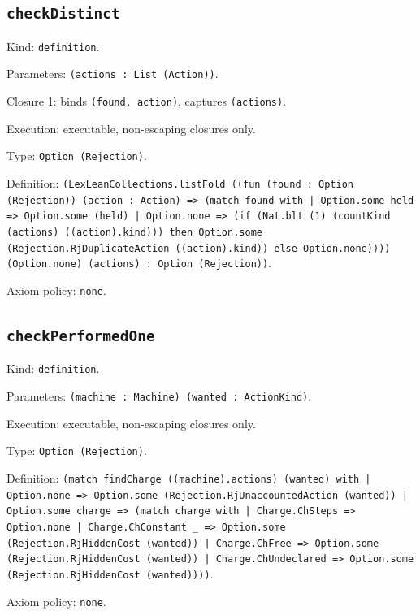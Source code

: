 \documentclass[11pt]{article}
\begin{document}
\subsection*{\texttt{checkDistinct}}
\noindent Kind: \texttt{definition}.\par
\noindent Parameters: \texttt{(actions : List (Action))}.\par
\noindent Closure 1: binds \texttt{(found, action)}, captures \texttt{(actions)}.\par
\noindent Execution: executable, non-escaping closures only.\par
\noindent Type: \texttt{Option (Rejection)}.\par
\noindent Definition: \texttt{(LexLeanCollections.listFold ((fun (found : Option (Rejection)) (action : Action) => (match found with | Option.some held => Option.some (held) | Option.none => (if (Nat.blt (1) (countKind (actions) ((action).kind))) then Option.some (Rejection.RjDuplicateAction ((action).kind)) else Option.none)))) (Option.none) (actions) : Option (Rejection))}.\par
\noindent Axiom policy: \texttt{none}.\par
\subsection*{\texttt{checkPerformedOne}}
\noindent Kind: \texttt{definition}.\par
\noindent Parameters: \texttt{(machine : Machine) (wanted : ActionKind)}.\par
\noindent Execution: executable, non-escaping closures only.\par
\noindent Type: \texttt{Option (Rejection)}.\par
\noindent Definition: \texttt{(match findCharge ((machine).actions) (wanted) with | Option.none => Option.some (Rejection.RjUnaccountedAction (wanted)) | Option.some charge => (match charge with | Charge.ChSteps => Option.none | Charge.ChConstant \_ => Option.some (Rejection.RjHiddenCost (wanted)) | Charge.ChFree => Option.some (Rejection.RjHiddenCost (wanted)) | Charge.ChUndeclared => Option.some (Rejection.RjHiddenCost (wanted))))}.\par
\noindent Axiom policy: \texttt{none}.\par
\end{document}
